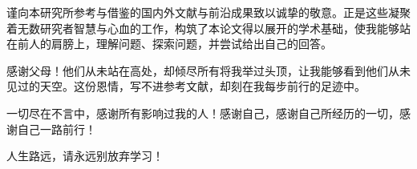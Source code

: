 
\acknowledgement
   
谨向本研究所参考与借鉴的国内外文献与前沿成果致以诚挚的敬意。正是这些凝聚着无数研究者智慧与心血的工作，构筑了本论文得以展开的学术基础，使我能够站在前人的肩膀上，理解问题、探索问题，并尝试给出自己的回答。

感谢父母！他们从未站在高处，却倾尽所有将我举过头顶，让我能够看到他们从未见过的天空。这份恩情，写不进参考文献，却刻在我每步前行的足迹中。

一切尽在不言中，感谢所有影响过我的人！感谢自己，感谢自己所经历的一切，感谢自己一路前行！

人生路远，请永远别放弃学习！
